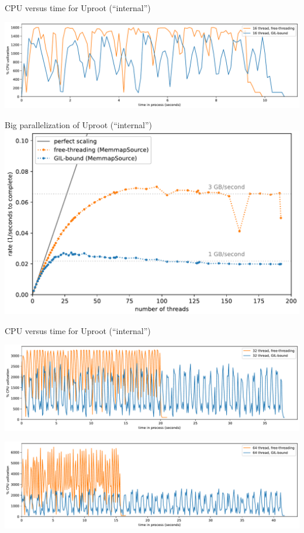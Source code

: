 \documentclass[aspectratio=169]{beamer}
\begin{document}
\begin{frame}{CPU versus time for Uproot (``internal'')}
\vspace{0.25 cm}
\begin{center}
\includegraphics[width=0.93\linewidth]{img/cpu-of-uproot-internal-16.pdf}
\end{center}
\end{frame}

\begin{frame}{Big parallelization of Uproot (``internal'')}
\vspace{0.5 cm}
\includegraphics[width=0.8\linewidth]{img/scaling-of-uproot-internal-big.pdf}
\end{frame}

\begin{frame}{CPU versus time for Uproot (``internal'')}
\vspace{0.25 cm}
\begin{center}
\includegraphics[width=0.93\linewidth]{img/cpu-of-uproot-internal-big-32.pdf}

\includegraphics[width=0.93\linewidth]{img/cpu-of-uproot-internal-big-64.pdf}
\end{center}
\end{frame}
\end{document}
